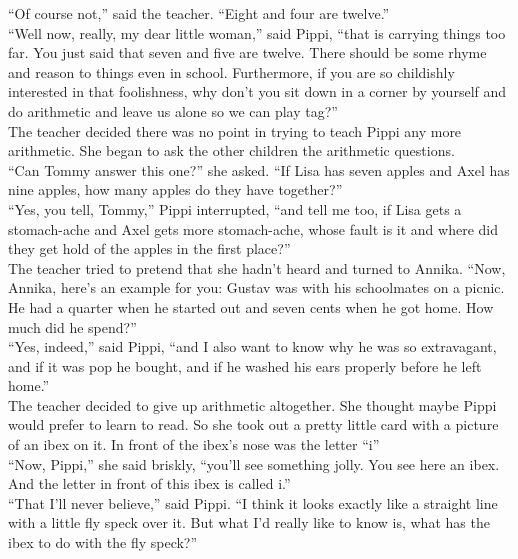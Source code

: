 \documentclass{standard}
\begin{document}
“Of course not,” said the teacher. “Eight and four are twelve.”\\

“Well now, really, my dear little woman,” said Pippi, “that is carrying things too far. You just said that seven and five are twelve. There should be some rhyme and reason to things even in school. Furthermore, if you are so childishly interested in that foolishness, why don’t you sit down in a corner by yourself and do arithmetic and leave us alone so we can play tag?”\\

The teacher decided there was no point in trying to teach Pippi any more arithmetic. She began to ask the other children the arithmetic questions.\\

“Can Tommy answer this one?” she asked. “If Lisa has seven apples and Axel has nine apples, how many apples do they have together?”\\

“Yes, you tell, Tommy,” Pippi interrupted, “and tell me too, if Lisa gets a stomach-ache and Axel gets more stomach-ache, whose fault is it and where did they get hold of the apples in the first place?”\\

The teacher tried to pretend that she hadn’t heard and turned to Annika. “Now, Annika, here’s an example for you: Gustav was with his schoolmates on a picnic. He had a quarter when he started out and seven cents when he got home. How much did he spend?”\\

“Yes, indeed,” said Pippi, “and I also want to know why he was so extravagant, and if it was pop he bought, and if he washed his ears properly before he left home.”\\

The teacher decided to give up arithmetic altogether. She thought maybe Pippi would prefer to learn to read. So she took out a pretty little card with a picture of an ibex on it. In front of the ibex’s nose was the letter “i”\\

“Now, Pippi,” she said briskly, “you’ll see something jolly. You see here an ibex. And the letter in front of this ibex is called i.”\\

“That I’ll never believe,” said Pippi. “I think it looks exactly like a straight line with a little fly speck over it. But what I’d really like to know is, what has the ibex to do with the fly speck?”\\
\end{document}
